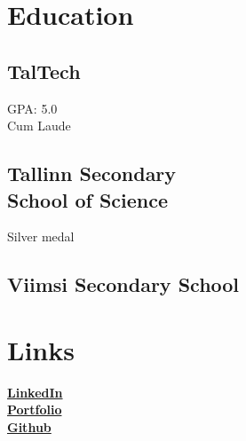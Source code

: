 \documentclass[letterpaper]{deedy-resume} %
\begin{document}
\begin{minipage}[t]{0.33\textwidth} %


\section{Education}

\subsection{TalTech}

GPA: 5.0 \\
Cum Laude


\sectionspace %

\subsection{Tallinn Secondary \\School of Science}

Silver medal

\sectionspace %

\subsection{Viimsi Secondary School}

\sectionspace %


\section{Links}

\href{https://www.linkedin.com/in/evo-annus-094362231/}{\bf LinkedIn} \\
\href{https://susiik.github.io/}{\bf Portfolio} \\
\href{https://github.com/susIik}{\bf Github} \\

\sectionspace %


\end{minipage}
\end{document}
